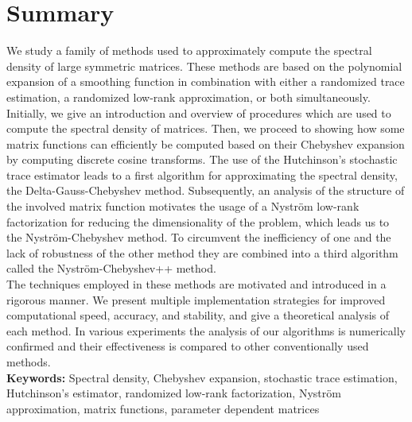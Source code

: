 \chapter*{Summary}
\label{chp:0-summary}

We study a family of methods used to approximately compute the spectral density
of large symmetric matrices. These methods are based on the polynomial expansion
of a smoothing function in combination with either a randomized trace estimation,
a randomized low-rank approximation, or both simultaneously.\\

Initially, we give an introduction and overview of procedures which are used
to compute the spectral density of matrices. Then, we proceed to showing how
some matrix functions can efficiently be computed based on
their Chebyshev expansion by computing discrete cosine transforms.
The use of the Hutchinson's stochastic trace estimator leads to a first
algorithm for approximating the spectral density, the Delta-Gauss-Chebyshev method.
Subsequently, an analysis of the structure of the involved matrix function
motivates the usage of a Nystr\"om low-rank factorization for reducing the
dimensionality of the problem, which leads us to the Nystr\"om-Chebyshev method.
To circumvent the inefficiency of one and the lack of robustness of the other
method they are combined into a third algorithm called the
Nystr\"om-Chebyshev++ method.\\

The techniques employed in these methods are motivated and introduced in a
rigorous manner. We present multiple implementation strategies for improved
computational speed, accuracy, and stability, and give a theoretical analysis
of each method. In various experiments the analysis of our algorithms is
numerically confirmed and their effectiveness is compared to other
conventionally used methods.\\

\textbf{Keywords:} Spectral density, Chebyshev expansion, stochastic trace estimation,
Hutchinson's estimator, randomized low-rank factorization, Nystr\"om approximation,
matrix functions, parameter dependent matrices
